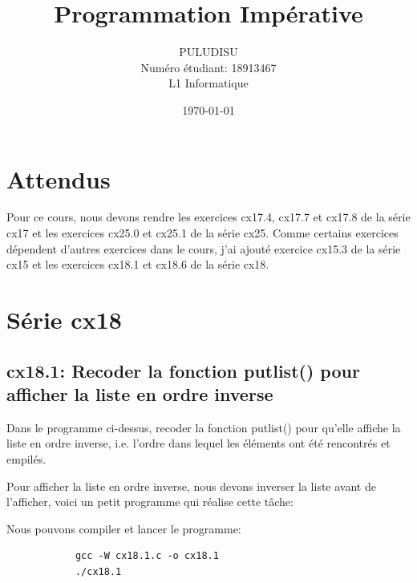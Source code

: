 \documentclass[a4paper,11pt]{article}
\title{Programmation Impérative}
\author{PULUDISU \bsc{Mpia Mimpiya}\\Numéro étudiant: 18913467 \\ L1 Informatique}
\date{\today}
\begin{document}
  \maketitle

  \tableofcontents

    \newpage
    \section{Attendus}
      \noindent Pour ce cours, nous devons rendre 
      les exercices cx17.4, cx17.7 et cx17.8 de la série cx17 et les exercices  cx25.0 et cx25.1 de la série cx25.
      Comme certains exercices dépendent d'autres exercices dans le cours, j'ai ajouté exercice cx15.3 de la série cx15 et les exercices cx18.1 et cx18.6 
      de la série cx18. 
       
    \newpage
    \section{Série cx18}
      \subsection{cx18.1: Recoder la fonction putlist() pour afficher la liste en ordre inverse}
        \noindent
        

        \noindent Dans le programme ci-dessus, recoder la fonction putlist() pour qu'elle affiche la liste en
        ordre inverse, i.e. l'ordre dans lequel les éléments ont été rencontrés et empilés.
        
        \bigskip
        \noindent Pour afficher la liste en ordre inverse, nous devons inverser la liste avant de l'afficher, 
        voici un petit programme qui réalise cette tâche: 

        

        \bigskip
        \noindent Nous pouvons compiler et lancer le programme: 
        \begin{tcolorbox}[colback=lightgray!6, colframe=black, left=-20mm, right=5mm, top=2mm, bottom=-2mm, boxrule=0.1mm]
          \begin{verbatim}
            gcc -W cx18.1.c -o cx18.1
            ./cx18.1
          \end{verbatim}
        \end{tcolorbox}
    
\end{document}
